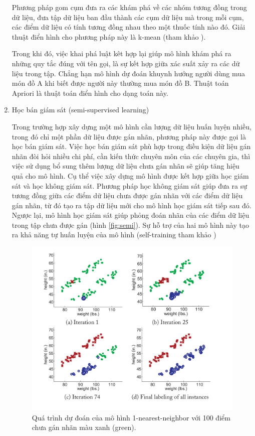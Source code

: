 \begin{enumerate}
    Phương pháp gom cụm đưa ra các khám phá về các nhóm tương đồng trong dữ liệu, đưa tập dữ liệu ban đầu thành các cụm dữ liệu mà trong mỗi cụm, các điểm dữ liệu có tính tương đồng nhau theo một thuốc tính nào đó. Giải thuật điển hình cho phương pháp này là k-mean (tham khảo \cite{tiep2018machine}). 
    
    Trong khi đó, việc khai phá luật kêt hợp lại giúp mô hình khám phá ra những quy tắc đúng với tên gọi, là sự kết hợp giữa xác suất xảy ra các dữ liệu trong tập. Chẳng hạn mô hình dự đoán khuynh hướng người dùng mua món đồ A khi biết được người này thường mua món đồ B. Thuật toán Apriori là thuật toán điển hình cho dạng toán này.

    \item Học bán giám sát (semi-supervised learning)

    Trong trường hợp xây dựng một mô hình cần lượng dữ liệu huấn luyện nhiều, trong đó chỉ một phần dữ liệu được gán nhãn, phương pháp này được gọi là học bán giám sát. Việc học bán giám sát phù hợp trong điều kiện dữ liệu gán nhãn đòi hỏi nhiều chi phí, cần kiến thức chuyên môn của các chuyên gia, thì việc sử dụng bổ sung thêm lượng dữ liệu chưa gán nhãn sẽ giúp tăng hiệu quả cho mô hình. Cụ thể việc xây dựng mô hình được kết hợp giữa học giám sát và học không giám sát. Phương pháp học không giám sát giúp đưa ra sự tương đồng giữa các điểm dữ liệu chưa được gán nhãn với các điểm dữ liệu gán nhãn, từ đó tạo ra tập dữ liệu mới cho mô hình học giám sát tiếp sau đó. Ngược lại, mô hình học giám sát giúp phỏng đoán nhãn của các điểm dữ liệu trong tập chưa được gán (hình \ref{fig:semi}). Sự hỗ trợ của hai mô hình này tạo ra khả năng tự huấn luyện của mô hình (self-training tham khảo \cite{zhu2009introduction})

    \begin{figure}[t]
        \begin{center}
            \includegraphics[width=\linewidth]{asset/image/semisupervised.png}
            \caption{Quá trình dự đoán của mô hình 1-nearest-neighbor với 100 điểm chưa gán nhãn màu xanh (green). }
            \label{fig:semi1}
        \end{center}
    \end{figure}


\end{enumerate}
